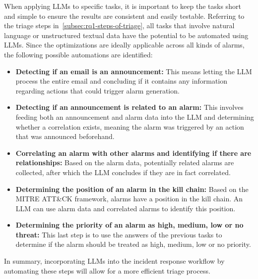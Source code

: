 When applying LLMs to specific tasks, it is important to keep the tasks short and simple to ensure the results are
consistent and easily testable.
Referring to the triage steps in\ \ref{subsec:rq1-steps-of-triage}, all tasks that involve natural language or
unstructured textual data have the potential to be automated using LLMs.
Since the optimizations are ideally applicable across all kinds of alarms, the following possible automations are
identified:
\begin{itemize}
    \item \textbf{Detecting if an email is an announcement:}
    This means letting the LLM process the entire email and concluding if it contains any information regarding actions
    that could trigger alarm generation.

    \item \textbf{Detecting if an announcement is related to an alarm:}
    This involves feeding both an announcement and alarm data into the LLM and determining whether a correlation
    exists, meaning the alarm was triggered by an action that was announced beforehand.

    \item \textbf{Correlating an alarm with other alarms and identifying if there are relationships:}
    Based on the alarm data, potentially related alarms are collected, after which the LLM concludes if they are in
    fact correlated.

    \item \textbf{Determining the position of an alarm in the kill chain:}
    Based on the MITRE ATT\&CK framework, alarms have a position in the kill chain.
    An LLM can use alarm data and correlated alarms to identify this position.

    \item \textbf{Determining the priority of an alarm as high, medium, low or no threat:}
    This last step is to use the answers of the previous tasks to determine if the alarm should be treated as high,
    medium, low or no priority.
\end{itemize}

In summary, incorporating LLMs into the incident response workflow by automating these steps will allow for a more
efficient triage process.